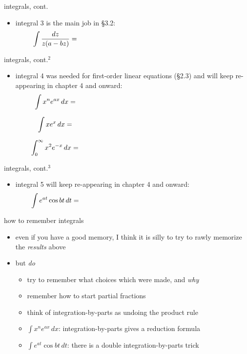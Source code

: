 \documentclass[colorlinks]{beamer}
\begin{document}
\begin{frame}{integrals, cont.}

\begin{itemize}
\item {\color{blue} integral 3} is the main job in \S3.2:
    $$\int \frac{dz}{z(a-bz)} = \hspace{80mm}$$

\vspace{50mm}
\end{itemize}
\end{frame}


\begin{frame}{integrals, cont.$^2$}

\begin{itemize}
\item {\color{blue} integral 4} was needed for first-order linear equations (\S2.3) and will keep re-appearing in chapter 4 and onward:
    $$\int x^n e^{ax}\,dx = \hspace{80mm}$$

\vspace{30mm}

$$\int x e^x\,dx = \hspace{80mm}$$

$$\int_0^\infty x^2 e^{-x}\,dx = \hspace{80mm}$$
\end{itemize}
\end{frame}


\begin{frame}{integrals, cont.$^3$}

\begin{itemize}
\item {\color{blue} integral 5} will keep re-appearing in chapter 4 and onward:
    $$\int e^{at} \cos bt\,dt = \hspace{80mm}$$

\vspace{60mm}
\end{itemize}
\end{frame}


\begin{frame}{how to remember integrals}

\begin{itemize}
\item even if you have a good memory, I think it is silly to try to rawly memorize the \emph{results} above
\item but \emph{do}
    \begin{itemize}
    \item try to remember what choices which were made, and \emph{why}
    \item remember how to start partial fractions
    \item think of integration-by-parts as undoing the product rule
    \item $\int x^n e^{ax}\,dx$: integration-by-parts gives a reduction formula
    \item $\int e^{at} \cos bt\,dt$: there is a double integration-by-parts trick
    \end{itemize}
\end{itemize}
\end{frame}
\end{document}
